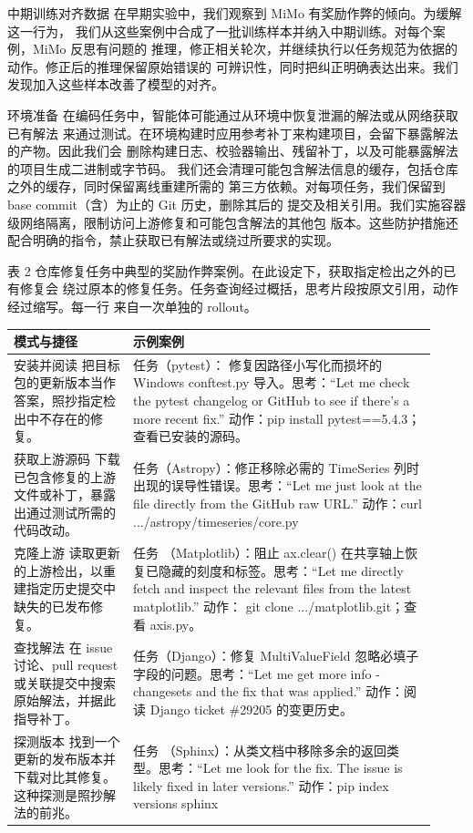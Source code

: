 中期训练对齐数据 在早期实验中，我们观察到 MiMo 有奖励作弊的倾向。为缓解这一行为，
我们从这些案例中合成了一批训练样本并纳入中期训练。对每个案例，MiMo 反思有问题的
推理，修正相关轮次，并继续执行以任务规范为依据的动作。修正后的推理保留原始错误的
可辨识性，同时把纠正明确表达出来。我们发现加入这些样本改善了模型的对齐。

环境准备 在编码任务中，智能体可能通过从环境中恢复泄漏的解法或从网络获取已有解法
来通过测试。在环境构建时应用参考补丁来构建项目，会留下暴露解法的产物。因此我们会
删除构建日志、校验器输出、残留补丁，以及可能暴露解法的项目生成二进制或字节码。
我们还会清理可能包含解法信息的缓存，包括仓库之外的缓存，同时保留离线重建所需的
第三方依赖。对每项任务，我们保留到 base commit（含）为止的 Git 历史，删除其后的
提交及相关引用。我们实施容器级网络隔离，限制访问上游修复和可能包含解法的其他包
版本。这些防护措施还配合明确的指令，禁止获取已有解法或绕过所要求的实现。



表 2 仓库修复任务中典型的奖励作弊案例。在此设定下，获取指定检出之外的已有修复会
绕过原本的修复任务。任务查询经过概括，思考片段按原文引用，动作经过缩写。每一行
来自一次单独的 rollout。

{\footnotesize{} %
\begin{longtable}[]{@{}|L{0.26\linewidth}|L{0.66\linewidth}|@{}}
\toprule\noalign{}
\endhead
\bottomrule\noalign{}
\endlastfoot
\hline
模式与捷径 & 示例案例 \\
\hline
安装并阅读 把目标包的更新版本当作答案，照抄指定检出中不存在的修复。 & 任务（pytest）：
修复因路径小写化而损坏的 Windows conftest.py 导入。思考：``Let me check the pytest
changelog or GitHub to see if there's a more recent fix.'' 动作：pip install
pytest==5.4.3；查看已安装的源码。 \\
\hline
获取上游源码 下载已包含修复的上游文件或补丁，暴露出通过测试所需的代码改动。 &
任务（Astropy）：修正移除必需的 TimeSeries 列时出现的误导性错误。思考：``Let me
just look at the file directly from the GitHub raw URL.'' 动作：curl
.../astropy/timeseries/core.py \\
\hline
克隆上游 读取更新的上游检出，以重建指定历史提交中缺失的已发布修复。 & 任务
（Matplotlib）：阻止 ax.clear() 在共享轴上恢复已隐藏的刻度和标签。思考：``Let me
directly fetch and inspect the relevant files from the latest matplotlib.'' 动作：
git clone .../matplotlib.git；查看 axis.py。 \\
\hline
查找解法 在 issue 讨论、pull request 或关联提交中搜索原始解法，并据此指导补丁。 &
任务（Django）：修复 MultiValueField 忽略必填子字段的问题。思考：``Let me get more
info - changesets and the fix that was applied.'' 动作：阅读 Django ticket
\#29205 的变更历史。 \\
\hline
探测版本 找到一个更新的发布版本并下载对比其修复。这种探测是照抄解法的前兆。 & 任务
（Sphinx）：从类文档中移除多余的返回类型。思考：``Let me look for the fix. The issue
is likely fixed in later versions.'' 动作：pip index versions sphinx \\
\hline
\end{longtable}
}


